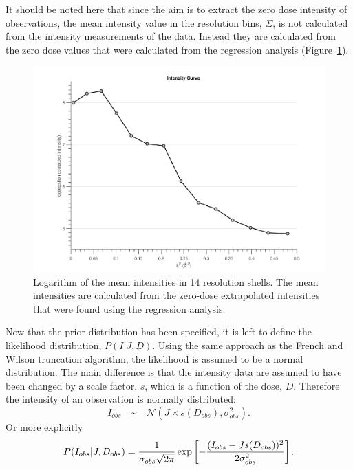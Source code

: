 It should be noted here that since the aim is to extract the zero dose intensity of observations, the mean intensity value in the resolution bins, $\Sigma$, is not calculated from the intensity measurements of the data.
Instead they are calculated from the zero dose values that were calculated from the regression analysis (Figure~\ref{fig:Zero-dose mean intensity in resolution shells - Extrapolation method}).
\begin{figure}
  \centering
    \includegraphics[width=1\textwidth]{figures/zde/extrapolationscaling.pdf}
    \caption[Logarithm of the zero-dose mean intensities in 14 resolution shells.]{Logarithm of the mean intensities in 14 resolution shells.
    The mean intensities are calculated from the zero-dose extrapolated intensities that were found using the regression analysis.}
    \label{fig:Zero-dose mean intensity in resolution shells - Extrapolation method}
\end{figure}

Now that the prior distribution has been specified, it is left to define the likelihood distribution, $P(I | J, D)$.
Using the same approach as the French and Wilson truncation algorithm, the likelihood is assumed to be a normal distribution.
The main difference is that the intensity data are assumed to have been changed by a scale factor, $s$, which is a function of the dose, $D$.
Therefore the intensity of an observation is normally distributed:
\begin{equation}
    I_{obs} \quad \text{\textasciitilde} \quad \mathcal{N}(J \times s(D_{obs}),\sigma_{obs}^2).
    \label{eq:Normally distributed intensity - Extrapolation method}
\end{equation}
Or more explicitly
\begin{equation}
    P(I_{obs} | J, D_{obs}) = \frac{1}{\sigma_{obs} \sqrt{2\pi}} \exp \left[-\frac{(I_{obs} - J s(D_{obs}))^2}{2 \sigma^2_{obs}} \right].
    \label{eq:Normally distributed intensity full equation - Extrapolation method}
\end{equation}


